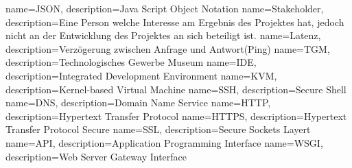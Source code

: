 \makeglossaries
{} {name=JSON, description={Java Script Object Notation}}
 {name=Stakeholder, description={Eine Person welche Interesse am Ergebnis des Projektes hat, jedoch nicht an der Entwicklung des Projektes an sich beteiligt ist.}}
 {name=Latenz, description={Verzögerung zwischen Anfrage und Antwort(Ping)}}
 {name=TGM, description={Technologisches Gewerbe Museum}}
 {name=IDE, description={Integrated Development Environment}}
 {name=KVM, description={Kernel-based Virtual Machine}}
 {name=SSH, description={Secure Shell}}
 {name=DNS, description={Domain Name Service}}
 {name=HTTP, description={Hypertext Transfer Protocol}}
 {name=HTTPS, description={Hypertext Transfer Protocol Secure}}
 {name=SSL, description={Secure Sockets Layert}}
 {name=API, description={Application Programming Interface}}
 {name=WSGI, description={Web Server Gateway Interface}}

\renewcommand*\glspostdescription{\dotfill}

